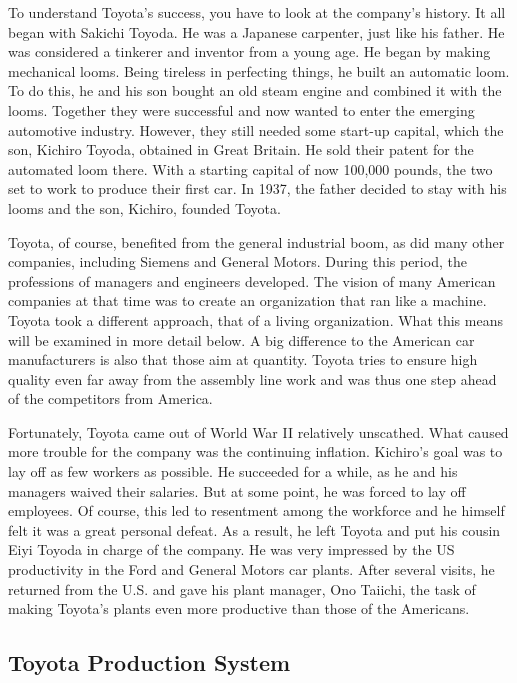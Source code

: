 \documentclass[a4paper,11pt]{article}
\begin{document}
To understand Toyota's success, you have to look at the company's history. It
all began with Sakichi Toyoda. He was a Japanese carpenter, just like his
father. He was considered a tinkerer and inventor from a young age. He began
by making mechanical looms. Being tireless in perfecting things, he built an
automatic loom. To do this, he and his son bought an old steam engine and
combined it with the looms. Together they were successful and now wanted to
enter the emerging automotive industry. However, they still needed some
start-up capital, which the son, Kichiro Toyoda, obtained in Great Britain. He
sold their patent for the automated loom there. With a starting capital of now
100,000 pounds, the two set to work to produce their first car. In 1937, the
father decided to stay with his looms and the son, Kichiro, founded Toyota.
    
Toyota, of course, benefited from the general industrial boom, as did many
other companies, including Siemens and General Motors. During this period, the
professions of managers and engineers developed. The vision of many American
companies at that time was to create an organization that ran like a
machine. Toyota took a different approach, that of a living organization. What
this means will be examined in more detail below. A big difference to the
American car manufacturers is also that those aim at quantity. Toyota tries to
ensure high quality even far away from the assembly line work and was thus one
step ahead of the competitors from America.
    
Fortunately, Toyota came out of World War II relatively unscathed. What caused
more trouble for the company was the continuing inflation. Kichiro's goal was
to lay off as few workers as possible. He succeeded for a while, as he and his
managers waived their salaries. But at some point, he was forced to lay off
employees. Of course, this led to resentment among the workforce and he
himself felt it was a great personal defeat. As a result, he left Toyota and
put his cousin Eiyi Toyoda in charge of the company. He was very impressed by
the US productivity in the Ford and General Motors car plants. After several
visits, he returned from the U.S. and gave his plant manager, Ono Taiichi, the
task of making Toyota's plants even more productive than those of the
Americans.
    
\subsection{Toyota Production System}
    
\end{document}
